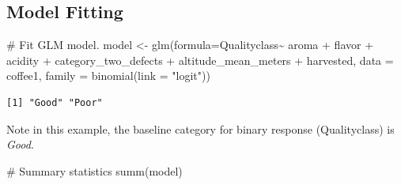 \documentclass[
  letterpaper,
  DIV=11,
  numbers=noendperiod]{scrartcl}
\newenvironment{Shaded}{\begin{snugshade}}{\end{snugshade}}
\newcommand{\AttributeTok}[1]{\textcolor[rgb]{0.40,0.45,0.13}{#1}}
\newcommand{\CommentTok}[1]{\textcolor[rgb]{0.37,0.37,0.37}{#1}}
\newcommand{\FunctionTok}[1]{\textcolor[rgb]{0.28,0.35,0.67}{#1}}
\newcommand{\NormalTok}[1]{\textcolor[rgb]{0.00,0.23,0.31}{#1}}
\newcommand{\OtherTok}[1]{\textcolor[rgb]{0.00,0.23,0.31}{#1}}
\newcommand{\SpecialCharTok}[1]{\textcolor[rgb]{0.37,0.37,0.37}{#1}}
\newcommand{\StringTok}[1]{\textcolor[rgb]{0.13,0.47,0.30}{#1}}
\begin{document}
\subsection{Model Fitting}\label{model-fitting}

\begin{Shaded}
\begin{Highlighting}[]
\CommentTok{\# Fit GLM model.}
\NormalTok{model }\OtherTok{\textless{}{-}} \FunctionTok{glm}\NormalTok{(}\AttributeTok{formula=}\NormalTok{Qualityclass}\SpecialCharTok{\textasciitilde{}}\NormalTok{ aroma }\SpecialCharTok{+}\NormalTok{ flavor }\SpecialCharTok{+}\NormalTok{ acidity }\SpecialCharTok{+}
\NormalTok{               category\_two\_defects }\SpecialCharTok{+} 
\NormalTok{               altitude\_mean\_meters }\SpecialCharTok{+} 
\NormalTok{               harvested,}
             \AttributeTok{data =}\NormalTok{ coffee1,}
             \AttributeTok{family =} \FunctionTok{binomial}\NormalTok{(}\AttributeTok{link =} \StringTok{"logit"}\NormalTok{))}
\end{Highlighting}
\end{Shaded}

\begin{Shaded}
\end{Shaded}

\begin{verbatim}
[1] "Good" "Poor"
\end{verbatim}

Note in this example, the baseline category for binary response
(Qualityclass) is \emph{Good}.

\begin{Shaded}
\begin{Highlighting}[]
\CommentTok{\# Summary statistics}
\FunctionTok{summ}\NormalTok{(model)}
\end{Highlighting}
\end{Shaded}
\end{document}
